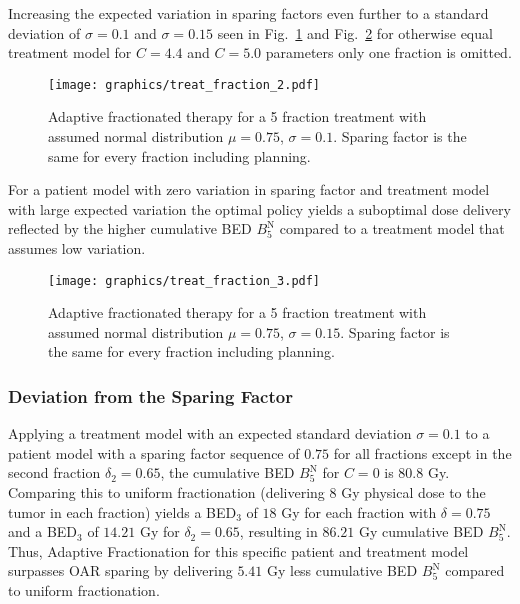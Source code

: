 \documentclass[\relativeRoot/ada.tex]{subfiles}
\begin{document}
Increasing the expected variation in sparing factors even further to a standard deviation of $\sigma=0.1$ and $\sigma=0.15$ seen in Fig.~\ref{fig:treat_fraction_2} and Fig.~\ref{fig:treat_fraction_3} for otherwise equal treatment model for $C=4.4$ and $C=5.0$ parameters only one fraction is omitted.

\begin{figure}[!htb]
    \centering
    \texttt{[image: graphics/treat\_fraction\_2.pdf]}
    \caption{Adaptive fractionated therapy for a 5 fraction treatment with assumed normal distribution $\mu=0.75$, $\sigma=0.1$. Sparing factor is the same for every fraction including planning.}
    \label{fig:treat_fraction_2}
\end{figure}

For a patient model with zero variation in sparing factor and treatment model with large expected variation the optimal policy yields a suboptimal dose delivery reflected by the higher cumulative BED $B_5^{\text{N}}$ compared to a treatment model that assumes low variation.

\begin{figure}[!htb]
    \centering
    \texttt{[image: graphics/treat\_fraction\_3.pdf]}
    \caption{Adaptive fractionated therapy for a 5 fraction treatment with assumed normal distribution $\mu=0.75$, $\sigma=0.15$. Sparing factor is the same for every fraction including planning.}
    \label{fig:treat_fraction_3}
\end{figure}

\subsubsection{Deviation from the Sparing Factor}

Applying a treatment model with an expected standard deviation $\sigma=0.1$ to a patient model with a sparing factor sequence of $0.75$ for all fractions except in the second fraction $\delta_2 = 0.65$, the cumulative BED $B_5^{\text{N}}$ for $C=0$ is $80.8$ Gy. Comparing this to uniform fractionation (delivering $8$ Gy physical dose to the tumor in each fraction) yields a BED$_3$ of $18$ Gy for each fraction with $\delta=0.75$ and a BED$_3$ of $14.21$ Gy for $\delta_2=0.65$, resulting in $86.21$ Gy cumulative BED $B_5^{\text{N}}$. Thus, Adaptive Fractionation for this specific patient and treatment model surpasses OAR sparing by delivering $5.41$ Gy less cumulative BED $B_5^{\text{N}}$ compared to uniform fractionation.
\end{document}
